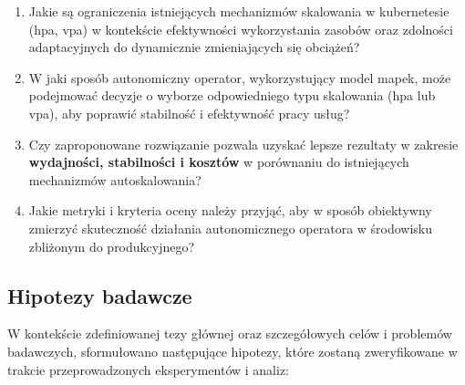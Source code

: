 \begin{enumerate}
    \item Jakie są ograniczenia istniejących mechanizmów skalowania w \Gls{kubernetes}ie (\Gls{hpa}, \Gls{vpa}) w kontekście efektywności wykorzystania zasobów oraz zdolności adaptacyjnych do dynamicznie zmieniających się obciążeń?
    
    \item W jaki sposób autonomiczny operator, wykorzystujący model \Gls{mapek}, może podejmować decyzje o wyborze odpowiedniego typu skalowania (\Gls{hpa} lub \Gls{vpa}), aby poprawić stabilność i efektywność pracy usług?
    
    \item Czy zaproponowane rozwiązanie pozwala uzyskać lepsze rezultaty w zakresie \textbf{wydajności, stabilności i kosztów} w porównaniu do istniejących mechanizmów autoskalowania?
    
    \item Jakie metryki i kryteria oceny należy przyjąć, aby w sposób obiektywny zmierzyć skuteczność działania autonomicznego operatora w środowisku zbliżonym do produkcyjnego?
\end{enumerate}


\subsection{Hipotezy badawcze}

W kontekście zdefiniowanej tezy głównej oraz szczegółowych celów i problemów badawczych, sformułowano następujące hipotezy, które zostaną zweryfikowane w trakcie przeprowadzonych eksperymentów i analiz:

